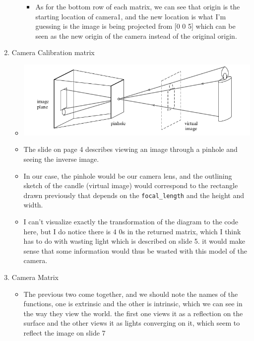 \documentclass{article}
\begin{document}
\begin{enumerate}
\begin{itemize}
\begin{itemize}
\item As for the bottom row of each matrix, we can see that origin is
the starting location of camera1, and the new location is what I'm
guessing is the image is being projected from [0 0 5] which can be
seen as the new origin of the camera instead of the original origin.
\end{itemize}
\end{itemize}
\item Camera Calibration matrix
\label{sec-4-2}
\begin{itemize}
\item \includegraphics[width=.9\linewidth]{light.png}
\item The slide on page 4 describes viewing an image through a pinhole and
seeing the inverse image.
\item In our case, the pinhole would be our camera lens, and the outlining
sketch of the candle (virtual image) would correspond to the
rectangle drawn previously that depends on the \texttt{focal\_length} and the
height and width.
\item Ι can't visualize exactly the transformation of the diagram to the
code here, but Ι do notice there is 4 0s in the returned matrix,
which I think has to do with wasting light which is described on
slide 5. it would make sense that some information would thus be
wasted with this model of the camera.
\end{itemize}
\item Camera Matrix
\label{sec-4-3}
\begin{itemize}
\item The previous two come together, and we should note the names of the
functions, one is extrinsic and the other is intrinsic, which we can
see in the way they view the world. the first one views it as a
reflection on the surface and the other views it as lights converging
on it, which seem to reflect the image on slide 7

\end{itemize}
\end{enumerate}
\end{document}
